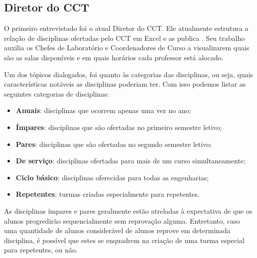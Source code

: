 \subsection{Diretor do CCT} %


O primeiro entrevistado foi o atual Diretor do CCT. Ele atualmente estrutura a relação de disciplinas ofertadas pelo CCT em Excel e as publica . Seu trabalho auxilia os Chefes de Laboratório e Coordenadores de Curso a visualizarem quais são as salas disponíveis e em quais horários cada professor está alocado.

Um dos tópicos dialogados, foi quanto às categorias das disciplinas, ou seja, quais características notáveis as disciplinas poderiam ter. Com isso podemos listar as seguintes categorias de disciplinas:

\begin{itemize}
  \item \textbf{Anuais}: disciplinas que ocorrem apenas uma vez no ano;
  \item \textbf{Ímpares}: disciplinas que são ofertadas no primeiro semestre letivo;
  \item \textbf{Pares}: disciplinas que são ofertadas no segundo semestre letivo;
  \item \textbf{De serviço}: disciplinas ofertadas para mais de um curso simultaneamente;
  \item \textbf{Ciclo básico}: disciplinas oferecidas para todas as engenharias;
  \item \textbf{Repetentes}: turmas criadas especialmente para repetentes.
\end{itemize}


As disciplinas ímpares e pares geralmente estão atreladas à expectativa de que os alunos progredirão sequencialmente sem reprovação alguma. Entretanto, caso uma quantidade de alunos considerável de alunos reprove em determinada disciplina, é possível que estes se enquadrem na criação de uma turma especial para repetentes, ou não.

